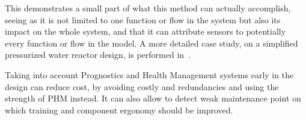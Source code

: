 This demonstrates a small part of what this method can actually accomplish, seeing as it is not limited to one function or flow in the system but also its impact on the whole system, and that it can attribute sensors to potentially every function or flow in the model. A more detailed case study, on a simplified pressurized water reactor design, is performed in~\cite{lher2016}.

Taking into account Prognostics and Health Management systems early in the design can reduce cost, by avoiding costly and redundancies and using the strength of PHM instead. It can also allow to detect weak maintenance point on which training and component ergonomy should be improved.


